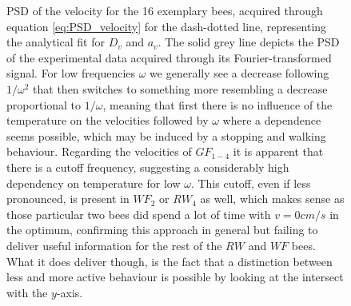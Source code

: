 \begin{figure}%
    \centering
    \caption{PSD of the velocity for the 16 exemplary bees, acquired through equation \ref{eq:PSD_velocity} for the dash-dotted line, representing the analytical fit for $D_{v}$ and $a_{v}$. The solid grey line depicts the PSD of the experimental data acquired through its Fourier-transformed signal. For low frequencies $\omega$ we generally see a decrease following $1/\omega^{2}$ that then switches to something more resembling a decrease proportional to $1/\omega$, meaning that first there is no influence of the temperature on the velocities followed by $\omega$ where a dependence seems possible, which may be induced by a stopping and walking behaviour. Regarding the velocities of $GF_{1-4}$ it is apparent that there is a cutoff frequency, suggesting a considerably high dependency on temperature for low $\omega$. This cutoff, even if less pronounced, is present in $WF_2$ or $RW_4$ as well, which makes sense as those particular two bees did spend a lot of time with $v=0cm/s$ in the optimum, confirming this approach in general but failing to deliver useful information for the rest of the $RW$ and $WF$ bees. What it does deliver though, is the fact that a distinction between less and more active behaviour is possible by looking at the intersect with the $y$-axis.}
    \label{fig:PSD_velocity}
\end{figure}

